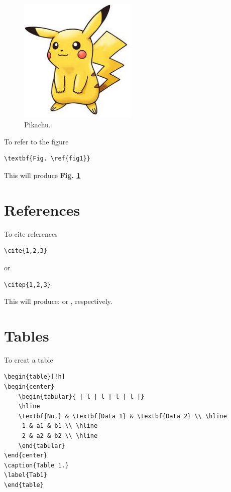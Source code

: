 \begin{figure}[h!]
  \centering
    \includegraphics[width=0.5\textwidth]{fig/pikachu}
 \caption{Pikachu.}
\label{fig1}
\end{figure}

\noindent To refer to the figure

\begin{verbatim}
\textbf{Fig. \ref{fig1}}
\end{verbatim}

\noindent This will produce \textbf{Fig. \ref{fig1}}

\section{References}

To cite references

\begin{verbatim}
\cite{1,2,3}
\end{verbatim}
or
\begin{verbatim}
\citep{1,2,3}
\end{verbatim}

\noindent This will produce: \cite{1,2,3} or \citep{1,2,3}, respectively.

\section{Tables}

To creat a table

\begin{verbatim}
\begin{table}[!h]
\begin{center}
    \begin{tabular}{ | l | l | l | l |}
    \hline
    \textbf{No.} & \textbf{Data 1} & \textbf{Data 2} \\ \hline
     1 & a1 & b1 \\ \hline
     2 & a2 & b2 \\ \hline
    \end{tabular}
\end{center}
\caption{Table 1.}
\label{Tab1}
\end{table}
\end{verbatim}

